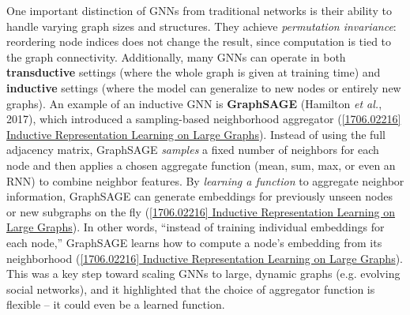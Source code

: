 \documentclass[12pt,a4paper]{report}
\begin{document}
One important distinction of GNNs from traditional networks is their ability to handle varying graph sizes and structures. They achieve \textit{permutation invariance}: reordering node indices does not change the result, since computation is tied to the graph connectivity. Additionally, many GNNs can operate in both \textbf{transductive} settings (where the whole graph is given at training time) and \textbf{inductive} settings (where the model can generalize to new nodes or entirely new graphs). An example of an inductive GNN is \textbf{GraphSAGE} (Hamilton \textit{et al.}, 2017), which introduced a sampling-based neighborhood aggregator (\href{https://arxiv.org/abs/1706.02216#:~:text=to%20unseen%20nodes,graph}{[1706.02216] Inductive Representation Learning on Large Graphs}). Instead of using the full adjacency matrix, GraphSAGE \textit{samples} a fixed number of neighbors for each node and then applies a chosen aggregate function (mean, sum, max, or even an RNN) to combine neighbor features. By \textit{learning a function} to aggregate neighbor information, GraphSAGE can generate embeddings for previously unseen nodes or new subgraphs on the fly (\href{https://arxiv.org/abs/1706.02216#:~:text=to%20unseen%20nodes,graph}{[1706.02216] Inductive Representation Learning on Large Graphs}). In other words, “instead of training individual embeddings for each node,” GraphSAGE learns how to compute a node’s embedding from its neighborhood (\href{https://arxiv.org/abs/1706.02216#:~:text=to%20unseen%20nodes,graph}{[1706.02216] Inductive Representation Learning on Large Graphs}). This was a key step toward scaling GNNs to large, dynamic graphs (e.g. evolving social networks), and it highlighted that the choice of aggregator function is flexible – it could even be a learned function.
\end{document}
